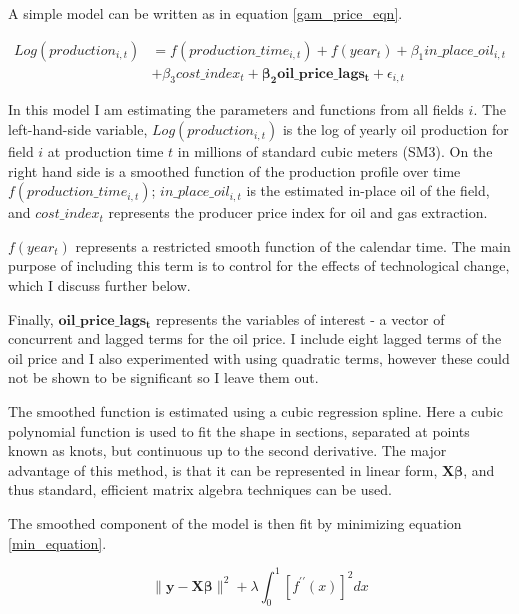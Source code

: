 \documentclass[12pt]{article}
\begin{document}
A simple model can be written as in equation \ref{gam_price_eqn}. 

\begin{equation}
\begin{split}
	Log(production_{i,t}) & = f(production\_time_{i,t}) + f(year_t) + \beta_1 in\_place\_oil_{i,t}\\
	 \quad & + \beta_3 cost\_index_{t} + \mathbf{\beta_2 oil\_price\_lags_t} +  
	  \epsilon_{i,t}
\label{gam_price_eqn}
\end{split}
\end{equation}

In this model I am estimating the parameters and functions from all fields $i$. The left-hand-side variable, $Log(production_{i,t})$ is the log of yearly oil production for field $i$ at production time $t$ in millions of standard cubic meters (SM3).  On the right hand side is a smoothed function of the production profile over time $f(production\_time_{i,t})$; $in\_place\_oil_{i,t}$ is the estimated in-place oil of the field, and $cost\_index_{t}$ represents the producer price index for oil and gas extraction. 

$f(year_t)$ represents a restricted smooth function of the calendar time.  The main purpose of including this term is to control for the effects of technological change, which I discuss further below.

Finally, $\mathbf{oil\_price\_lags_t}$ represents the variables of interest - a vector of concurrent and lagged terms for the oil price. I include eight lagged terms of the oil price and I also experimented with using quadratic terms, however these could not be shown to be significant so I leave them out. 

The smoothed function is estimated using a cubic regression spline. Here a cubic polynomial function is used to fit the shape in sections, separated at points known as knots, but continuous up to the second derivative.  The major advantage of this method, is that it can be represented in linear form, $\boldsymbol{X \beta} $, and thus standard, efficient matrix algebra techniques can be used.  

The smoothed component of the model is then fit by minimizing equation \ref{min_equation}.

\begin{equation}
\| \mathbf{y} - \mathbf{X\beta} \| ^2 + \lambda \int_{0}^{1} [f^{\prime \prime}(x)]^2 dx
\label{min_equation}
\end{equation}
\end{document}
